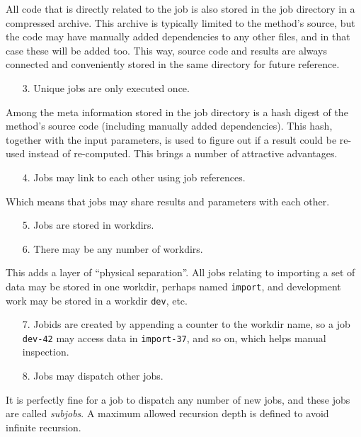 All code that is directly related to the job is also stored in the job
directory in a compressed archive.  This archive is typically limited
to the method's source, but the code may have manually added
dependencies to any other files, and in that case these will be added
too.  This way, source code and results are always connected and
conveniently stored in the same directory for future reference.
\begin{itemize}
\item[3.]  Unique jobs are only executed once.
\end{itemize}
Among the meta information stored in the job directory is a hash
digest of the method's source code (including manually added
dependencies).  This hash, together with the input parameters, is used
to figure out if a result could be re-used instead of re-computed.
This brings a number of attractive advantages.
\begin{itemize}
\item[4.]  Jobs may link to each other using job references.
\end{itemize}
Which means that jobs may share results and parameters with each other.
\begin{itemize}
\item[5.]  Jobs are stored in workdirs.
\item[6.]  There may be any number of workdirs.
\end{itemize}
This adds a layer of ``physical separation''.  All jobs relating to
importing a set of data may be stored in one workdir, perhaps named
\texttt{import}, and development work may be stored in a workdir
\texttt{dev}, etc.
\begin{itemize}
\item[7.] Jobids are created by appending a counter to the
workdir name, so a job \texttt{dev-42} may access data in
\texttt{import-37}, and so on, which helps manual inspection.
\end{itemize}
\begin{itemize}
\item[8.] Jobs may dispatch other jobs.
\end{itemize}
It is perfectly fine for a job to dispatch any number of new jobs, and
these jobs are called \textsl{subjobs}.  A maximum allowed recursion
depth is defined to avoid infinite recursion.



